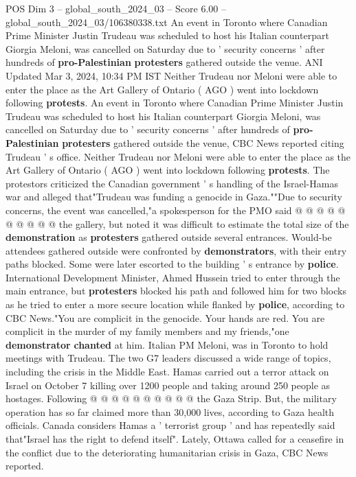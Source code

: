\begin{textsample}{POS Dim 3 – global\_south\_2024\_03 – Score 6.00 – global\_south\_2024\_03/106380338.txt}  \label{ex:f3_pos_416}
An event in Toronto where Canadian Prime Minister Justin Trudeau was scheduled to host his Italian counterpart Giorgia Meloni, was cancelled on Saturday due to ' security concerns ' after hundreds of \textbf{pro-Palestinian} \textbf{protesters} gathered outside the venue.
ANI Updated Mar 3, 2024, 10:34 PM IST Neither Trudeau nor Meloni were able to enter the place as the Art Gallery of Ontario ( AGO ) went into lockdown following \textbf{protests}.
An event in Toronto where Canadian Prime Minister Justin Trudeau was scheduled to host his Italian counterpart Giorgia Meloni, was cancelled on Saturday due to ' security concerns ' after hundreds of \textbf{pro-Palestinian} \textbf{protesters} gathered outside the venue, CBC News reported citing Trudeau ' s office.
Neither Trudeau nor Meloni were able to enter the place as the Art Gallery of Ontario ( AGO ) went into lockdown following \textbf{protests}.
The protestors criticized the Canadian government ' s handling of the Israel-Hamas war and alleged that"Trudeau was funding a genocide in Gaza.""Due to security concerns, the event was cancelled,"a spokesperson for the PMO said @ @ @ @ @ @ @ @ @ @ the gallery, but noted it was difficult to estimate the total size of the \textbf{demonstration} as \textbf{protesters} gathered outside several entrances.
Would-be attendees gathered outside were confronted by \textbf{demonstrators}, with their entry paths blocked.
Some were later escorted to the building ' s entrance by \textbf{police}.
International Development Minister, Ahmed Hussein tried to enter through the main entrance, but \textbf{protesters} blocked his path and followed him for two blocks as he tried to enter a more secure location while flanked by \textbf{police}, according to CBC News."You are complicit in the genocide.
Your hands are red.
You are complicit in the murder of my family members and my friends,"one \textbf{demonstrator} \textbf{chanted} at him.
Italian PM Meloni, was in Toronto to hold meetings with Trudeau.
The two G7 leaders discussed a wide range of topics, including the crisis in the Middle East.
Hamas carried out a terror attack on Israel on October 7 killing over 1200 people and taking around 250 people as hostages.
Following @ @ @ @ @ @ @ @ @ @ the Gaza Strip.
But, the military operation has so far claimed more than 30,000 lives, according to Gaza health officials.
Canada considers Hamas a ' terrorist group ' and has repeatedly said that"Israel has the right to defend itself".
Lately, Ottawa called for a ceasefire in the conflict due to the deteriorating humanitarian crisis in Gaza, CBC News reported.

\end{textsample}
